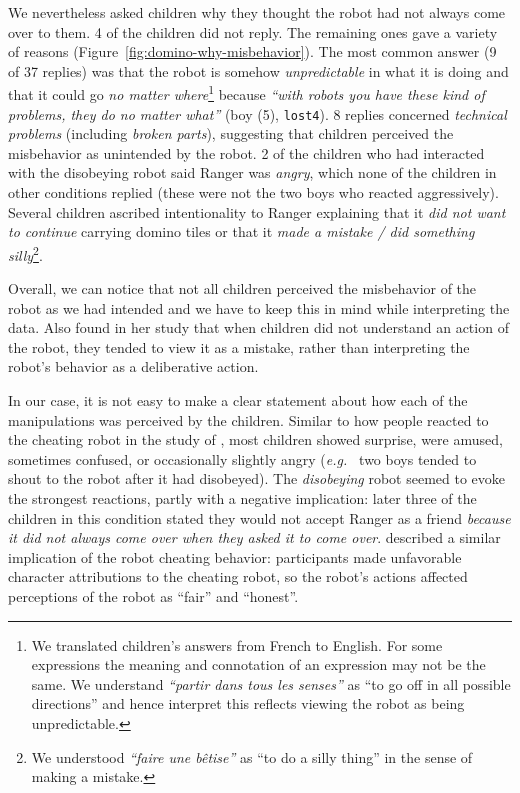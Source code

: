 \documentclass{sig-alternate}
\newcommand{\eg}{{\textit{e.g.~}}}
\begin{document}
We nevertheless asked children why they thought the robot had not always come
over to them. 4 of the children did not reply. The remaining ones gave a variety
of reasons (Figure~\ref{fig:domino-why-misbehavior}). The most common answer (9
of 37 replies) was that the robot is somehow \textit{unpredictable} in what it
is doing and that it could go \textit{no matter where}\footnote{We translated
children's answers from French to English. For some expressions the meaning and
connotation of an expression may not be the same. We understand \textit{``partir
dans tous les senses''} as ``to go off in all possible directions'' and hence
interpret this reflects viewing the robot as being unpredictable.} because
\textit{``with robots you have these kind of problems, they do no matter what''}
(boy (5), \texttt{lost4}). 8 replies concerned \textit{technical problems}
(including \textit{broken parts}), suggesting that children perceived the
misbehavior as unintended by the robot. 2 of the children who had interacted
with the disobeying robot said Ranger was \textit{angry}, which none of the
children in other conditions replied (these were not the two boys who reacted
aggressively). Several children ascribed intentionality to Ranger explaining
that it \textit{did not want to continue} carrying domino tiles or that it
\textit{made a mistake / did something silly}\footnote{We understood
\textit{``faire une bêtise''} as ``to do a silly thing'' in the sense of making
a mistake.}.


Overall, we can notice that not all children perceived the misbehavior of the
robot as we had intended and we have to keep this in mind while interpreting the
data. Also \cite{leite_long-term_2013} found in her study that when children did
not understand an action of the robot, they tended to view it as a mistake,
rather than interpreting the robot's behavior as a deliberative action.


In our case, it is not easy to make a clear statement about how each of the
manipulations was perceived by the children.  Similar to how people reacted to
the cheating robot in the study of \cite{short_no_2010}, most children showed
surprise, were amused, sometimes confused, or occasionally slightly angry (\eg
two boys tended to shout to the robot after it had disobeyed). The
\textit{disobeying} robot seemed to evoke the strongest reactions, partly with a
negative implication: later three of the children in this condition stated they
would not accept Ranger as a friend \textit{because it did not always come over
when they asked it to come over}. \cite{short_no_2010} described a similar
implication of the robot cheating behavior: participants made unfavorable
character attributions to the cheating robot, so the robot's actions affected
perceptions of the robot as ``fair'' and ``honest''.
\end{document}

